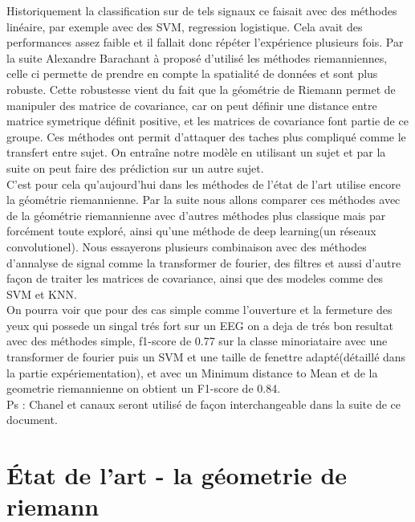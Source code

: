 \documentclass{article}[12pt]
\begin{document}
Historiquement la classification sur de tels signaux ce faisait avec des méthodes linéaire, par exemple avec des SVM, regression logistique. Cela avait des performances assez faible et il fallait donc répéter l’expérience plusieurs fois. Par la suite Alexandre Barachant à proposé d'utilisé les méthodes riemanniennes, celle ci permette de prendre en compte la spatialité de données et sont plus robuste. Cette robustesse vient du fait que la géométrie de Riemann permet de manipuler des matrice de covariance, car on peut définir une distance entre matrice symetrique définit positive, et les matrices de covariance font partie de ce groupe. Ces méthodes ont permit d'attaquer des taches plus compliqué comme le transfert entre sujet. On entraîne notre modèle en utilisant un sujet et par la suite on peut faire des prédiction sur un autre sujet.\\

C'est pour cela qu'aujourd'hui dans les méthodes de l’état de l'art utilise encore la géométrie riemannienne. Par la suite nous allons comparer ces méthodes avec de la géométrie riemannienne avec d'autres méthodes plus classique mais par forcément toute exploré, ainsi qu'une méthode de deep learning(un réseaux convolutionel). Nous essayerons plusieurs combinaison avec des méthodes d'annalyse de signal comme la transformer de fourier, des filtres et aussi d'autre façon de traiter les matrices de covariance, ainsi que des modeles comme des SVM et KNN.\\

On pourra voir que pour des cas simple comme l'ouverture et la fermeture des yeux qui possede un singal trés fort sur un EEG on a deja de trés bon resultat avec des méthodes simple, f1-score de 0.77 sur la classe minoriataire avec une transformer de fourier puis un SVM et une taille de fenettre adapté(détaillé dans la partie expériementation), et avec un Minimum distance to Mean et de la geometrie riemannienne on obtient un F1-score de 0.84.\\

Ps : Chanel et canaux seront utilisé de façon interchangeable dans la suite de ce document.
\part{État de l'art - la géometrie de riemann}
\end{document}
